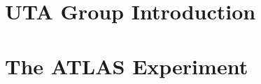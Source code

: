 \documentclass[11pt]{article}
\def\onehead#1{\part{#1}}
\begin{document}
\pagestyle{empty}
\baselineskip=23pt
\normalsize

\noindent



\newpage



\newpage

\newpage
\pagestyle{plain}
\setcounter{page}{1}


\onehead{UTA Group Introduction}


\newpage


















\onehead{The ATLAS Experiment}


\end{document}
